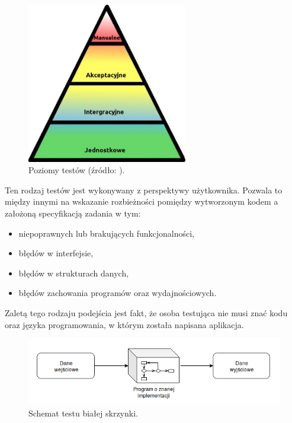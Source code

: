 \begin{figure}[h]
    \centering
    \includegraphics[width = 7cm]{chapter02/tests_levels.jpg}
    \caption{Poziomy testów (źródło: \cite{tests-levels}).}
    \label{fig:tests-levels}
\end{figure}

Ten rodzaj testów jest wykonywany z perspektywy użytkownika.
Pozwala to między innymi na wskazanie rozbieżności pomiędzy wytworzonym kodem a założoną specyfikacją zadania w tym:
\begin {itemize}
    \item niepoprawnych lub brakujących funkcjonalności,
    \item błędów w interfejsie,
    \item błędów w strukturach danych,
    \item błędów zachowania programów oraz wydajnościowych.
\end{itemize}
Zaletą tego rodzaju podejścia jest fakt, że osoba testująca nie musi znać kodu oraz języka programowania, w którym została napisana aplikacja.

\begin{figure}[h]
    \centering
    \includegraphics[width = 13cm]{chapter02/white-box.png}
    \caption{Schemat testu białej skrzynki.}
    \label{fig:white-box}
\end{figure}

